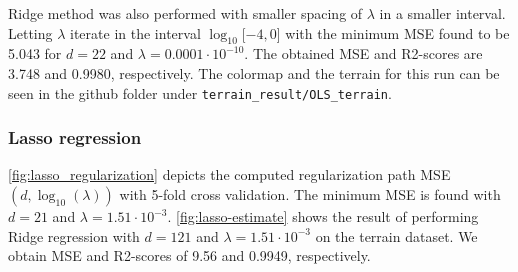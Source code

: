 \documentclass[../main.tex]{subfiles}
\begin{document}
Ridge method was also performed with smaller spacing of $\lambda$ in a smaller interval. Letting $\lambda$ iterate in the interval $\log_{10}[ -4,0 $] with the minimum MSE found to be 5.043 for \ensuremath{d=22} and \ensuremath{\lambda=0.0001\cdot 10^{-10}}. The obtained MSE and R2-scores are 3.748 and 0.9980, respectively. The colormap and the terrain for this run can be seen in the github folder under \verb|terrain_result/OLS_terrain|. 

\subsubsection{Lasso regression}
\autoref{fig:lasso_regularization} depicts the computed regularization path MSE$(d,\log_{10}(\lambda))$ with 5-fold cross validation. The minimum MSE is found with \ensuremath{d=21} and \ensuremath{\lambda=1.51 \cdot 10^{-3}}. \autoref{fig:lasso-estimate} shows the result of performing Ridge regression with $d=121$ and $\lambda=1.51 \cdot 10^{-3}$ on the terrain dataset. We obtain MSE and R2-scores of 9.56 and 0.9949, respectively.
\end{document}
